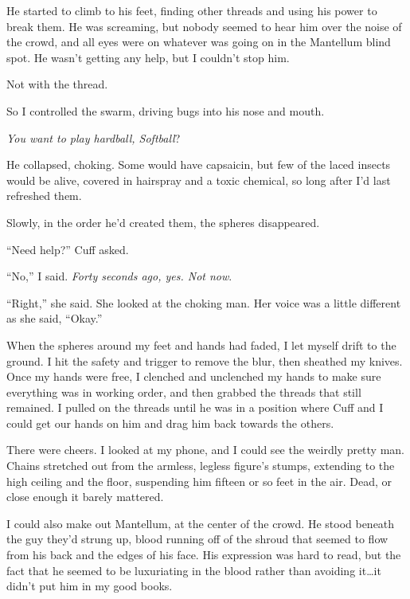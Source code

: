 He started to climb to his feet, finding other threads and using his power to break them.  He was screaming, but nobody seemed to hear him over the noise of the crowd, and all eyes were on whatever was going on in the Mantellum blind spot.  He wasn't getting any help, but I couldn't stop him.



Not with the thread.



So I controlled the swarm, driving bugs into his nose and mouth.



\emph{You want to play hardball, Softball}?



He collapsed, choking.  Some would have capsaicin, but few of the laced insects would be alive, covered in hairspray and a toxic chemical, so long after I'd last refreshed them.



Slowly, in the order he'd created them, the spheres disappeared.



``Need help?'' Cuff asked.



``No,'' I said.  \emph{Forty seconds ago, yes.  Not now}.



``Right,'' she said.  She looked at the choking man.  Her voice was a little different as she said, ``Okay.''



When the spheres around my feet and hands had faded, I let myself drift to the ground.  I hit the safety and trigger to remove the blur, then sheathed my knives.  Once my hands were free, I clenched and unclenched my hands to make sure everything was in working order, and then grabbed the threads that still remained.  I pulled on the threads until he was in a position where Cuff and I could get our hands on him and drag him back towards the others.



There were cheers.  I looked at my phone, and I could see the weirdly pretty man.  Chains stretched out from the armless, legless figure's stumps, extending to the high ceiling and the floor, suspending him fifteen or so feet in the air.  Dead, or close enough it barely mattered.



I could also make out Mantellum, at the center of the crowd.  He stood beneath the guy they'd strung up, blood running off of the shroud that seemed to flow from his back and the edges of his face.  His expression was hard to read, but the fact that he seemed to be luxuriating in the blood rather than avoiding it\ldots it didn't put him in my good books.



